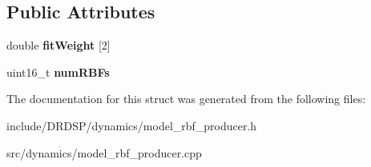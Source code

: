 \subsection*{Public Attributes}
\begin{DoxyCompactItemize}
\item 
\hypertarget{struct_d_r_d_s_p_1_1_model_r_b_f_producer_a5d35a43063696662599f445eeef7acaa}{double {\bfseries fit\-Weight} \mbox{[}2\mbox{]}}\label{struct_d_r_d_s_p_1_1_model_r_b_f_producer_a5d35a43063696662599f445eeef7acaa}

\item 
\hypertarget{struct_d_r_d_s_p_1_1_model_r_b_f_producer_a2ba6c5222df9a07b22103bec640d25f6}{uint16\-\_\-t {\bfseries num\-R\-B\-Fs}}\label{struct_d_r_d_s_p_1_1_model_r_b_f_producer_a2ba6c5222df9a07b22103bec640d25f6}

\end{DoxyCompactItemize}


The documentation for this struct was generated from the following files\-:\begin{DoxyCompactItemize}
\item 
include/\-D\-R\-D\-S\-P/dynamics/model\-\_\-rbf\-\_\-producer.\-h\item 
src/dynamics/model\-\_\-rbf\-\_\-producer.\-cpp\end{DoxyCompactItemize}
